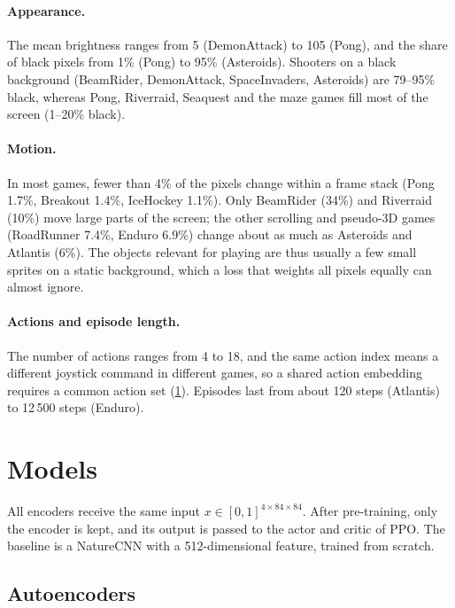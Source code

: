 \documentclass[runningheads]{llncs}
\begin{document}
\paragraph{Appearance.} The mean brightness ranges from 5 (DemonAttack) to 105 (Pong), and
the share of black pixels from 1\% (Pong) to 95\% (Asteroids). Shooters on a black background
(BeamRider, DemonAttack, SpaceInvaders, Asteroids) are 79--95\% black, whereas Pong, Riverraid,
Seaquest and the maze games fill most of the screen (1--20\% black).

\paragraph{Motion.} In most games, fewer than 4\% of the pixels change within a frame stack
(Pong 1.7\%, Breakout 1.4\%, IceHockey 1.1\%). Only BeamRider (34\%) and Riverraid (10\%) move
large parts of the screen; the other scrolling and pseudo-3D games (RoadRunner 7.4\%, Enduro
6.9\%) change about as much as Asteroids and Atlantis (6\%). The objects relevant for playing are thus usually a few small sprites on a static background,
which a loss that weights all pixels equally can almost ignore.

\paragraph{Actions and episode length.} The number of actions ranges from 4 to 18, and the same
action index means a different joystick command in different games, so a shared action
embedding requires a common action set (\cref{sec:models}). Episodes last from about
120 steps (Atlantis) to 12\,500 steps (Enduro).

\section{Models}
\label{sec:models}

All encoders receive the same input $x\in[0,1]^{4\times84\times84}$. After pre-training, only the encoder is kept, and its output is passed to the actor and critic
of PPO. The baseline is a NatureCNN with a 512-dimensional feature, trained
from scratch.

\FloatBarrier
\subsection{Autoencoders}
\end{document}
